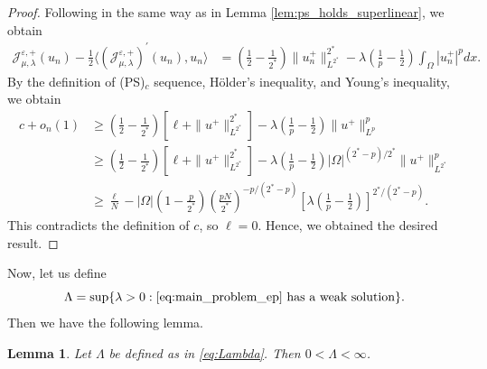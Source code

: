 \documentclass[11pt]{article}
\newtheorem{lemma}{Lemma}[section] %
\newcommand{\om} {\Omega}
\newcommand{\la} {\lambda}
\newcommand{\La} {\Lambda}
\newcommand{\Jep}{\mathcal{J}_{\mu, \lambda}^{\varepsilon,+}}
\begin{document}
\begin{proof}
Following in the same way as in Lemma \ref{lem:ps_holds_superlinear}, we obtain
\begin{align*}
    \Jep(u_n) - \frac{1}{2} \langle (\Jep)^{\prime}(u_n), u_n \rangle 
    &= \left( \frac{1}{2} - \frac{1}{2^*} \right) \|u_n^+\|_{L^{2^*}}^{2^*} - \lambda \left( \frac{1}{p} - \frac{1}{2} \right)\int_{\Omega} |u_n^+|^p  dx.
\end{align*}
By the definition of (PS)\(_c\) sequence, H\"{o}lder's inequality, and Young’s inequality, we obtain
\begin{align*}
    c + o_n(1) &\geq \left( \frac{1}{2} - \frac{1}{2^*} \right) \left[ \ell + \|u^+\|_{L^{2^*}}^{2^*} \right]
    - \lambda \left( \frac{1}{p} - \frac{1}{2} \right) \|u^+\|_{L^p}^p \\
    &\geq \left( \frac{1}{2} - \frac{1}{2^*} \right) \left[ \ell + \|u^+\|_{L^{2^*}}^{2^*} \right]
    - \lambda \left( \frac{1}{p} - \frac{1}{2} \right) |\om|^{(2^*-p)/2^*} \|u^+\|_{L^{2^*}}^p \\
    &\geq \frac{\ell}{N}
    - |\Omega| \left(1 - \frac{ p}{2^*} \right) \left( \frac{pN}{2^*} \right)^{-p/(2^* - p)}
    \left[ \lambda \left( \frac{1}{p} - \frac{1}{2} \right) \right]^{2^*/(2^* - p)}.
\end{align*}
This contradicts the definition of \( c \), so \( \ell = 0 \). Hence, we obtained the desired result.
\end{proof}
Now, let us define 
\begin{equation}\label{eq:Lambda}
    \La = \sup \{ \la > 0 : \eqref{eq:main_problem_ep} \text{ has a weak solution} \}.
\end{equation}
Then we have the following lemma.
\begin{lemma}
Let $\La$ be defined as in \eqref{eq:Lambda}. Then $0 < \La < \infty$.
\end{lemma}
\end{document}
